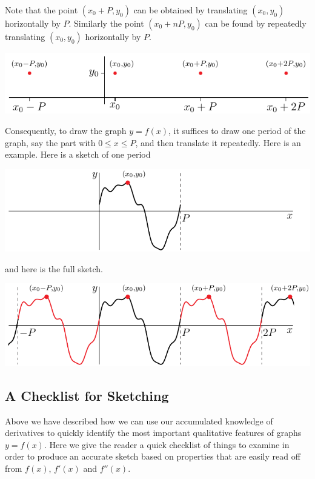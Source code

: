 Note that the point $(x_0+P,y_0)$ can be obtained by translating $(x_0,y_0)$
horizontally by $P$. Similarly the point $(x_0+nP,y_0)$ can be found by repeatedly
translating $(x_0,y_0)$ horizontally by $P$.
\begin{efig}
\begin{center}
   \includegraphics{periodicPt}
\end{center}
\end{efig}
Consequently, to draw the graph $y=f(x)$, it suffices to draw one period
of the graph, say the part with $0\le x\le P$, and then translate it repeatedly. Here is
an example. Here is a sketch of one period
\begin{efig}
\begin{center}
   \includegraphics{periodicInt}
\end{center}
\end{efig}
and here is the full sketch.
\begin{efig}
\begin{center}
   \includegraphics{periodicFull}
\end{center}
\end{efig}

\subsection{A Checklist for Sketching}
Above we have described how we can use our accumulated knowledge of derivatives
to quickly identify the most important qualitative features of
graphs $y=f(x)$. Here we give the reader a quick checklist of things to examine
in order to produce an accurate sketch based on properties that are easily read
off from $f(x)$, $f'(x)$ and $f''(x)$.


